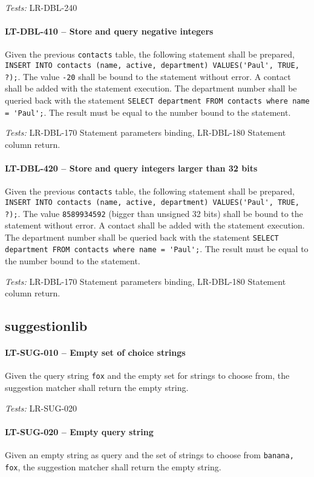 \textit{Tests: } LR-DBL-240

\paragraph{LT-DBL-410 -- Store and query negative integers}
Given the previous \lstinline{contacts} table,
the following statement shall be prepared,
\lstinline{INSERT INTO contacts (name, active, department) VALUES('Paul', TRUE, ?);}.
The value \lstinline{-20} shall be bound to the statement without error.
A contact shall be added with the statement execution.
The department number shall be queried back with the statement
\lstinline{SELECT department FROM contacts where name = 'Paul';}.
The result must be equal to the number bound to the statement.

\textit{Tests: } LR-DBL-170 Statement parameters binding, LR-DBL-180 Statement
column return.

\paragraph{LT-DBL-420 -- Store and query integers larger than 32 bits}
Given the previous \lstinline{contacts} table,
the following statement shall be prepared,
\lstinline{INSERT INTO contacts (name, active, department) VALUES('Paul', TRUE, ?);}.
The value \lstinline{8589934592} (bigger than unsigned 32 bits)
shall be bound to the statement without error.
A contact shall be added with the statement execution.
The department number shall be queried back with the statement
\lstinline{SELECT department FROM contacts where name = 'Paul';}.
The result must be equal to the number bound to the statement.

\textit{Tests: } LR-DBL-170 Statement parameters binding, LR-DBL-180 Statement
column return.

\subsection{suggestion\textunderscore lib}
\paragraph{LT-SUG-010 -- Empty set of choice strings}
Given the query string \lstinline{fox} and the empty set for strings
to choose from, the suggestion matcher shall return the empty string.

\textit{Tests: } LR-SUG-020

\paragraph{LT-SUG-020 -- Empty query string}
Given an empty string as query and the set of strings to choose
from \lstinline{banana, fox}, the suggestion matcher shall
return the empty string.

